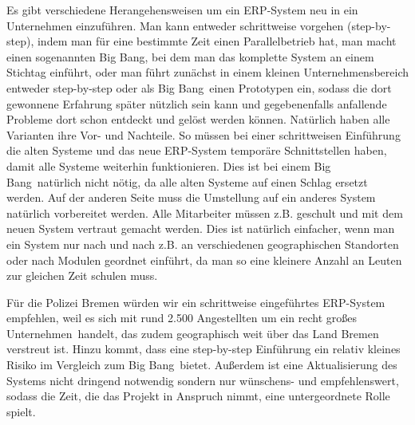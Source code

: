 \documentclass[12pt,utf8]{scrartcl}
\begin{document}
{Es gibt verschiedene Herangehensweisen um ein ERP-System neu in ein Unternehmen einzuführen. Man kann entweder schrittweise vorgehen (step-by-step), indem man für eine bestimmte Zeit einen Parallelbetrieb hat, man macht einen sogenannten \glqq Big Bang\grqq, bei dem man das komplette System an einem Stichtag einführt, oder man führt zunächst in einem kleinen Unternehmensbereich entweder step-by-step oder als \glqq Big Bang\grqq\ einen Prototypen ein, sodass die dort gewonnene Erfahrung später nützlich sein kann und gegebenenfalls anfallende Probleme dort schon entdeckt und gelöst werden können. Natürlich haben alle Varianten ihre Vor- und Nachteile. So müssen bei einer schrittweisen Einführung die alten Systeme und das neue ERP-System temporäre Schnittstellen haben, damit alle Systeme weiterhin funktionieren. Dies ist bei einem \glqq Big Bang\grqq\ natürlich nicht nötig, da alle alten Systeme auf einen Schlag ersetzt werden. Auf der anderen Seite muss die Umstellung auf ein anderes System natürlich vorbereitet werden. Alle Mitarbeiter müssen z.B. geschult und mit dem neuen System vertraut gemacht werden. Dies ist natürlich einfacher, wenn man ein System nur nach und nach z.B. an verschiedenen geographischen Standorten oder nach Modulen geordnet einführt, da man so eine kleinere Anzahl an Leuten zur gleichen Zeit schulen muss\cite{Jacob2008}. 

Für die Polizei Bremen würden wir ein schrittweise eingeführtes ERP-System empfehlen, weil es sich mit rund 2.500 Angestellten um ein recht großes \glqq Unternehmen\grqq\ handelt, das zudem geographisch weit über das Land Bremen verstreut ist\cite{PolizeiBremen}. Hinzu kommt, dass eine step-by-step Einführung ein relativ kleines Risiko im Vergleich zum \glqq Big Bang\grqq\ bietet. Außerdem ist eine Aktualisierung des Systems nicht dringend notwendig sondern nur wünschens- und empfehlenswert, sodass die Zeit, die das Projekt in Anspruch nimmt, eine untergeordnete Rolle spielt\cite{Hansmann2005}. 

}
\end{document}
